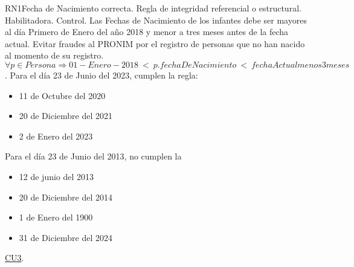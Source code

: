 \begin{BussinesRule}{RN1}{Fecha de Nacimiento correcta.}
	\BRitem[Tipo:] Regla de integridad referencial o estructural. 
	\BRitem[Clase:] Habilitadora. 
	\BRitem[Nivel:] Control. %
	\BRitem[Descripción:]	Las Fechas de Nacimiento de los infantes debe ser mayores al día Primero de Enero del año 2018 y menor a tres meses antes de la fecha actual.
	\BRitem[Motivación:] Evitar fraudes al PRONIM por el registro de personas que no han nacido al momento de su registro.
	\BRitem[Sentencia:] $\forall p \in Persona \Rightarrow 01-Enero-2018~<~p.fechaDeNacimiento~<~fechaActual menos 3 meses$.
	 Para el día 23 de Junio del 2023, cumplen la regla: 		
        \begin{itemize}
        	\item 11 de Octubre del 2020
			\item 20 de Diciembre del 2021
			\item 2 de Enero del 2023
        \end{itemize}
	
	 Para el día 23 de Junio del 2013, no cumplen la 
		\begin{itemize}
        	\item 12 de junio del 2013
			\item 20 de Diciembre del 2014
			\item 1 de Enero del 1900
			\item 31 de Diciembre del 2024
        \end{itemize}
	
	 \hyperlink{CU3}{CU3}.
\end{BussinesRule}

